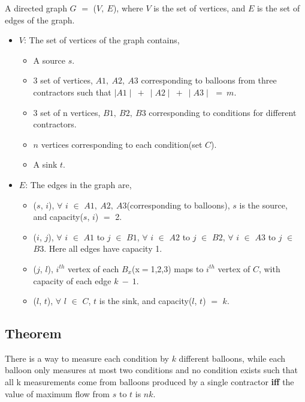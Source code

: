 \documentclass[pdftex,a4paper,12pt]{report}
\begin{document}
A directed graph $G$ $=$ ($V,\ E$), where $V$ is the set of vertices, and $E$ is the set of edges of the graph.

\begin{itemize}
 \item \underline{\textbf{$V$}}: The set of vertices of the graph contains,
     \begin{itemize}
     \item A source $s$.
     \item 3 set of vertices, $A1,\ A2,\ A3$ corresponding to balloons from three contractors such that $\mid A1 \mid\ +\ \mid A2 \mid\ +\ \mid A3 \mid$ $=\ m$.
     \item 3 set of n vertices, $B1,\ B2,\ B3$ corresponding to conditions for different contractors.
     \item $n$ vertices corresponding to each condition(set $C$).
     \item A sink $t$.
     \end{itemize}
 \item \underline{\textbf{$E$}}: The edges in the graph are,
     \begin{itemize}
     \item ($s$, $i$), $\forall$ $i$ $\in$ $A1,\ A2,\ A3$(corresponding to balloons), $s$ is the source,\\and capacity($s$, $i$) $=$ 2.
     \item ($i$, $j$), $\forall$ $i$ $\in$ $A1$ to $j$ $\in$ $B1$, $\forall$ $i$ $\in$ $A2$ to $j$ $\in$ $B2$, $\forall$ $i$ $\in$ $A3$ to $j$ $\in$ $B3$. Here all edges have capacity 1.
     \item ($j$, $l$), $i^{th}$ vertex of each $B_x$(x$=$1,2,3) maps to $i^{th}$ vertex of $C$, with capacity of each edge $k\ -\ 1$.
     \item ($l$, $t$), $\forall$ $l$ $\in$ $C$, $t$ is the sink, and capacity($l$, $t$) $=$ $k$.
     \end{itemize}
\end{itemize}

\subsection{Theorem}

There is a way to measure each condition by $k$ different balloons, while each balloon only measures at most two conditions and no condition exists such that all k measurements come from balloons produced by a single contractor \textbf{iff} the value of maximum flow from $s$ to $t$ is $nk$.
\end{document}
